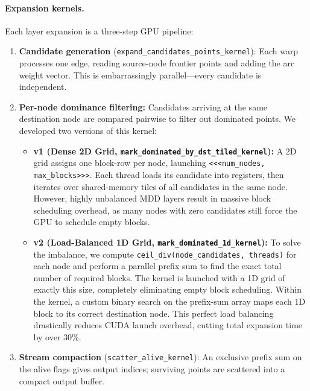\documentclass[11pt]{article}
\begin{document}
\paragraph{Expansion kernels.}
Each layer expansion is a three-step GPU pipeline:

\begin{enumerate}
  \item \textbf{Candidate generation} (\texttt{expand\_candidates\_points\_kernel}):
        Each warp processes one edge, reading source-node frontier points
        and adding the arc weight vector.
        This is embarrassingly parallel---every candidate is independent.

  \item \textbf{Per-node dominance filtering:}
        Candidates arriving at the same destination node are compared pairwise to filter out dominated points. We developed two versions of this kernel:
        \begin{itemize}
            \item \textbf{v1 (Dense 2D Grid, \texttt{mark\_dominated\_by\_dst\_tiled\_kernel}):}
                  A 2D grid assigns one block-row per node, launching \texttt{<<<num\_nodes, max\_blocks>>>}. 
                  Each thread loads its candidate into registers, then iterates over shared-memory tiles of all candidates in the same node. 
                  However, highly unbalanced MDD layers result in massive block scheduling overhead, as many nodes with zero candidates still force the GPU to schedule empty blocks.
            \item \textbf{v2 (Load-Balanced 1D Grid, \texttt{mark\_dominated\_1d\_kernel}):}
                  To solve the imbalance, we compute \texttt{ceil\_div(node\_candidates, threads)} for each node and perform a parallel prefix sum to find the exact total number of required blocks.
                  The kernel is launched with a 1D grid of exactly this size, completely eliminating empty block scheduling.
                  Within the kernel, a custom binary search on the prefix-sum array maps each 1D block to its correct destination node.
                  This perfect load balancing drastically reduces CUDA launch overhead, cutting total expansion time by over 30\%.
        \end{itemize}

  \item \textbf{Stream compaction} (\texttt{scatter\_alive\_kernel}):
        An exclusive prefix sum on the alive flags gives output indices;
        surviving points are scattered into a compact output buffer.
\end{enumerate}
\end{document}
